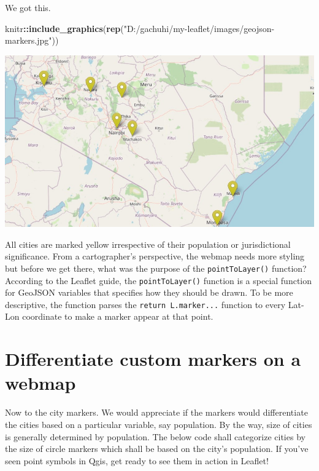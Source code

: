 \documentclass[
]{book}
\newenvironment{Shaded}{\begin{snugshade}}{\end{snugshade}}
\newcommand{\FunctionTok}[1]{\textcolor[rgb]{0.13,0.29,0.53}{\textbf{#1}}}
\newcommand{\NormalTok}[1]{#1}
\newcommand{\SpecialCharTok}[1]{\textcolor[rgb]{0.81,0.36,0.00}{\textbf{#1}}}
\newcommand{\StringTok}[1]{\textcolor[rgb]{0.31,0.60,0.02}{#1}}
\begin{document}
We got this.

\begin{Shaded}
\begin{Highlighting}[]
\NormalTok{knitr}\SpecialCharTok{::}\FunctionTok{include\_graphics}\NormalTok{(}\FunctionTok{rep}\NormalTok{(}\StringTok{"D:/gachuhi/my{-}leaflet/images/geojson{-}markers.jpg"}\NormalTok{))}
\end{Highlighting}
\end{Shaded}

\includegraphics{../images/geojson-markers.jpg}

All cities are marked yellow irrespective of their population or jurisdictional significance. From a cartographer's perspective, the webmap needs more styling but before we get there, what was the purpose of the \texttt{pointToLayer()} function? According to the Leaflet guide, the \texttt{pointToLayer()} function is a special function for GeoJSON variables that specifies how they should be drawn. To be more descriptive, the function parses the \texttt{return\ L.marker...} function to every Lat-Lon coordinate to make a marker appear at that point.

\hypertarget{differentiate-custom-markers-on-a-webmap}{%
\section{Differentiate custom markers on a webmap}\label{differentiate-custom-markers-on-a-webmap}}

Now to the city markers. We would appreciate if the markers would differentiate the cities based on a particular variable, say population. By the way, size of cities is generally determined by population. The below code shall categorize cities by the size of circle markers which shall be based on the city's population. If you've seen point symbols in Qgis, get ready to see them in action in Leaflet!
\end{document}
